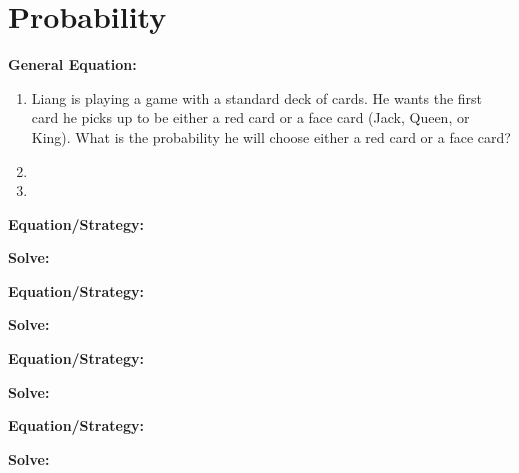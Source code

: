 \section{Probability}

\textbf{General Equation:}

\begin{enumerate}[labelindent=*,style=multiline,leftmargin=*,label=\textbf{Example \arabic*:}]
\item Liang is playing a game with a standard deck of cards. He wants the first card he picks up to be either a red card or a face card (Jack, Queen, or King). What is the probability he will choose either a red card or a face card?
\vfill\item
\vfill\item
\end{enumerate}

\vfill
\newpage
\begin{multicols*}{2}
\begin{outline}[enumerate]
\medium

\1 

\bigskip
\textbf{Equation/Strategy:} \hrulefill

\bigskip
\textbf{Solve:}

\vfill
\2 
\2 
\2 
\2 
\2 

\midline

\1 

\bigskip
\textbf{Equation/Strategy:} \hrulefill

\bigskip
\textbf{Solve:}

\vfill
\2 
\2 
\2 
\2 
\2 

\columnbreak
\advanced

\1 

\bigskip
\textbf{Equation/Strategy:} \hrulefill

\bigskip
\textbf{Solve:}

\vfill
\2 
\2 
\2 
\2 
\2 

\midline

\1 

\bigskip
\textbf{Equation/Strategy:}

\bigskip
\textbf{Solve:}

\vfill
\2
\2
\2
\2
\2
\end{outline}
\end{multicols*}